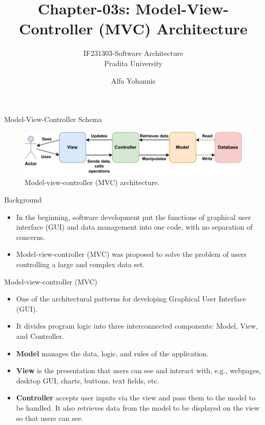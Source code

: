 \documentclass{beamer}
\title{Chapter-03s: Model-View-Controller (MVC) Architecture}
\subtitle{IF231303-Software Architecture\\Pradita University}
\author{Alfa Yohannis}
\begin{document}
\begin{frame}[plain]
    \maketitle
\end{frame}

\begin{frame}{Model-View-Controller Schema}
\begin{figure}[h]
    \centering
    \includegraphics[width=\textwidth]{mvc}
    \caption{Model-view-controller (MVC) architecture.}
    \label{fig:mvc}
\end{figure}
\end{frame}

\begin{frame}{Background}
\begin{itemize}
\item In the beginning, software development put the functions of graphical user interface (GUI) and data management into one code, with no separation of concerns.
\item Model-view-controller (MVC) was proposed to solve the problem of users controlling a large and complex data set.
\end{itemize}
\end{frame}

\begin{frame}{Model-view-controller (MVC)}
\begin{itemize}
\item One of the architectural patterns for developing Graphical User Interface (GUI).
\item It divides program logic into three interconnected components: Model, View, and Controller.
\item \textbf{Model} manages the data, logic, and rules of the application.
\item \textbf{View} is the presentation that users can see and interact with, e.g., webpages, desktop GUI, charts, buttons, text fields, etc.
\item \textbf{Controller} accepts user inputs via the view and pass them to the model to be handled. It also retrieves data from the model to be displayed on the view so that users can see.

\end{itemize}
\end{frame}
\end{document}
